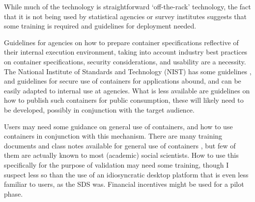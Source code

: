 \documentclass[inline]{hdsr}
\begin{document}

While much of the technology is straightforward `off-the-rack' technology, the fact that it is not being used by statistical agencies or survey institutes suggests that some training is required and guidelines for deployment needed. 
%
\begin{enumerate*}[label={(\arabic*)}, itemjoin={{ }}]
\item Guidelines for agencies on how to prepare container specifications reflective of their internal execution environment, taking into account industry best practices on container specifications, security considerations, and usability are a necessity. The National Institute of Standards and Technology (NIST) has some guidelines \citep{souppaya_application_2017}, and guidelines for secure use of containers for applications abound, and can be easily adapted to internal use at agencies. What is less available are guidelines on how to publish such containers for public consumption, these will likely need to be developed, possibly in conjunction with the target audience.

\item Users may need some guidance on general use of containers, and how to use containers in conjunction with this mechanism. There are many training documents and class notes available for general use of containers \citep{boettiger_introduction_2015,nust_automatically_2017,mcdermott_data_2023,the_turing_way_community_containers_2024,eyers_reproducible_2020,docker-stata,aea_data_editor_use_2021}, but few of them are actually known to most (academic) social scientists. How to use this specifically for the purpose of validation may need some training, though I suspect less so than the use of an idiosyncratic desktop platform that is even less familiar to users, as the \ac{SDS} was. Financial incentives might be used for a pilot phase.  
\end{enumerate*}

\end{document}
